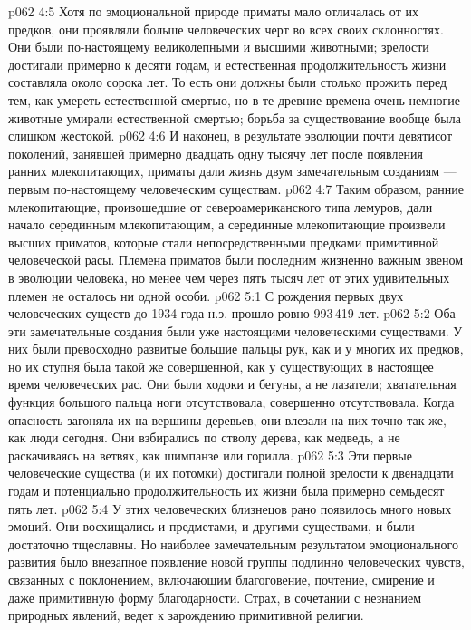 \vs p062 4:5 Хотя по эмоциональной природе приматы мало отличалась от их предков, они проявляли больше человеческих черт во всех своих склонностях. Они были по\hyp{}настоящему великолепными и высшими животными; зрелости достигали примерно к десяти годам, и естественная продолжительность жизни составляла около сорока лет. То есть они должны были столько прожить перед тем, как умереть естественной смертью, но в те древние времена очень немногие животные умирали естественной смертью; борьба за существование вообще была слишком жестокой.
\vs p062 4:6 И наконец, в результате эволюции почти девятисот поколений, занявшей примерно двадцать одну тысячу лет после появления ранних млекопитающих, приматы  дали жизнь двум замечательным созданиям --- первым по\hyp{}настоящему человеческим существам.
\vs p062 4:7 \pc Таким образом, ранние млекопитающие, произошедшие от североамериканского типа лемуров, дали начало серединным млекопитающим, а серединные млекопитающие произвели высших приматов, которые стали непосредственными предками примитивной человеческой расы. Племена приматов были последним жизненно важным звеном в эволюции человека, но менее чем через пять тысяч лет от этих удивительных племен не осталось ни одной особи.
\vs p062 5:1 С рождения первых двух человеческих существ до 1934 года н.э. прошло ровно 993\,419 лет.
\vs p062 5:2 Оба эти замечательные создания были уже настоящими человеческими существами. У них были превосходно развитые большие пальцы рук, как и у многих их предков, но их ступня была такой же совершенной, как у существующих в настоящее время человеческих рас. Они были ходоки и бегуны, а не лазатели; хватательная функция большого пальца ноги отсутствовала, совершенно отсутствовала. Когда опасность загоняла их на вершины деревьев, они влезали на них точно так же, как люди сегодня. Они взбирались по стволу дерева, как медведь, а не раскачиваясь на ветвях, как шимпанзе или горилла.
\vs p062 5:3 Эти первые человеческие существа (и их потомки) достигали полной зрелости к двенадцати годам и потенциально продолжительность их жизни была примерно семьдесят пять лет.
\vs p062 5:4 У этих человеческих близнецов рано появилось много новых эмоций. Они восхищались и предметами, и другими существами, и были достаточно тщеславны. Но наиболее замечательным результатом эмоционального развития было внезапное появление новой группы подлинно человеческих чувств, связанных с поклонением, включающим благоговение, почтение, смирение и даже примитивную форму благодарности. Страх, в сочетании с незнанием природных явлений, ведет к зарождению примитивной религии.
